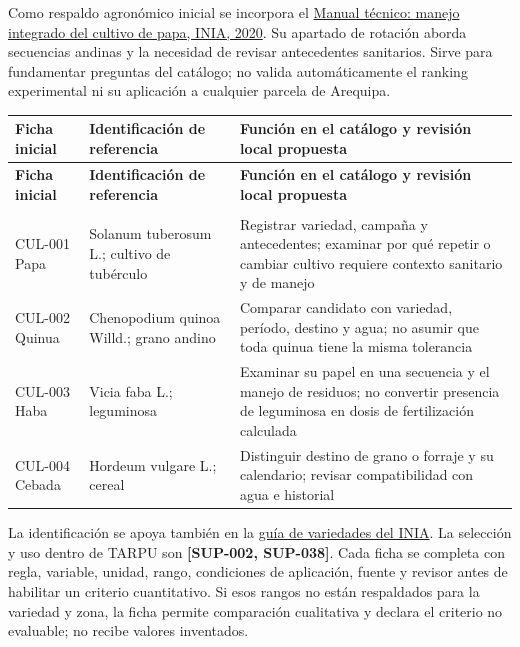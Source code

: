 \documentclass[10pt,a4paper]{article}
\begin{document}
Como respaldo agronómico inicial se incorpora el \href{https://repositorio.inia.gob.pe/handle/20.500.12955/1146}{Manual técnico: manejo integrado del cultivo de papa, INIA, 2020}. Su apartado de rotación aborda secuencias andinas y la necesidad de revisar antecedentes sanitarios. Sirve para fundamentar preguntas del catálogo; no valida automáticamente el ranking experimental ni su aplicación a cualquier parcela de Arequipa.


\begingroup\small
\begin{longtable}{>{\raggedright\arraybackslash}p{3.647cm}>{\raggedright\arraybackslash}p{5.867cm}>{\raggedright\arraybackslash}p{6.343cm}}
\toprule
\textbf{Ficha inicial} & \textbf{Identificación de referencia} & \textbf{Función en el catálogo y revisión local propuesta} \\
\midrule\endfirsthead
\toprule
\textbf{Ficha inicial} & \textbf{Identificación de referencia} & \textbf{Función en el catálogo y revisión local propuesta} \\
\midrule\endhead
\midrule\multicolumn{3}{r}{\scriptsize Continúa en la página siguiente}\\\endfoot
\bottomrule\endlastfoot
CUL-001 Papa & Solanum tuberosum L.; cultivo de tubérculo & Registrar variedad, campaña y antecedentes; examinar por qué repetir o cambiar cultivo requiere contexto sanitario y de manejo \\[3pt]
CUL-002 Quinua & Chenopodium quinoa Willd.; grano andino & Comparar candidato con variedad, período, destino y agua; no asumir que toda quinua tiene la misma tolerancia \\[3pt]
CUL-003 Haba & Vicia faba L.; leguminosa & Examinar su papel en una secuencia y el manejo de residuos; no convertir presencia de leguminosa en dosis de fertilización calculada \\[3pt]
CUL-004 Cebada & Hordeum vulgare L.; cereal & Distinguir destino de grano o forraje y su calendario; revisar compatibilidad con agua e historial \\[3pt]
\end{longtable}
\endgroup

La identificación se apoya también en la \href{https://repositorio.inia.gob.pe/bitstreams/0d597e50-7526-41fe-92a5-d158d88bff55/download}{guía de variedades del INIA}. La selección y uso dentro de TARPU son \textbf{[SUP-002, SUP-038]}. Cada ficha se completa con regla, variable, unidad, rango, condiciones de aplicación, fuente y revisor antes de habilitar un criterio cuantitativo. Si esos rangos no están respaldados para la variedad y zona, la ficha permite comparación cualitativa y declara el criterio no evaluable; no recibe valores inventados.
\end{document}

